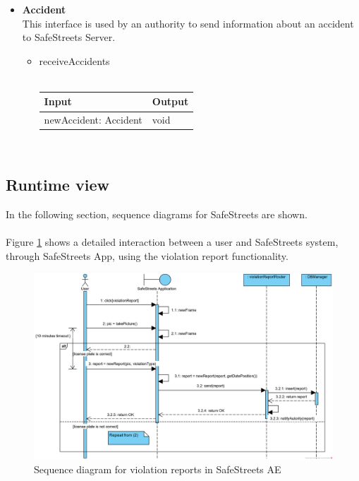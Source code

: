 \documentclass{article}
\begin{document}
\begin{itemize}
			\item \textbf{Accident}\\
				This interface is used by an authority to send information about an accident to SafeStreets Server.
				\begin{itemize}
					\item{receiveAccidents}\\\\
					\begin{tabular}{l | l}
						\textbf{Input} & \textbf{Output}\\
						\hline
						newAccident: Accident & void\\
					\end{tabular}\\
				\end{itemize}
		\end{itemize}
	
		\clearpage
		\subsection{Runtime	view}
			In the following section, sequence diagrams for SafeStreets are shown.\\
			\\
			Figure \ref{fig:sd-violationReport} shows a detailed interaction between a user and SafeStreets system, through SafeStreets App, using the violation report functionality.\\
			
			\begin{figure}[H]
				\centering
				\includegraphics [width=\textwidth] {diagrams/DD_SeqD_ViolationReport.png}
				\caption[Sequence diagram]{Sequence diagram for violation reports in SafeStreets AE}
				\label{fig:sd-violationReport}
			\end{figure}
		
\end{document}
